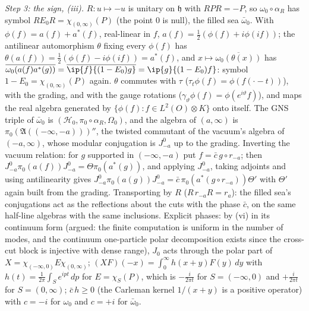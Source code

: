 \emph{Step 3: the sign, (iii).} $R : u \mapsto -u$ is unitary on $\mathfrak{h}$ with $RPR = -P$, so $\omega_{0}\circ\alpha_{R}$ has symbol $RE_{0}R = \chi_{(0,\infty)}(P)$ (the point $0$ is null), the filled sea $\bar\omega_{0}$. With $\phi(f) = a(f) + a^{*}(f)$, real-linear in $f$, $a(f) = \tfrac12(\phi(f) + i\phi(if))$; the antilinear automorphism $\theta$ fixing every $\phi(f)$ has $\theta(a(f)) = \tfrac12(\phi(f) - i\phi(if)) = a^{*}(f)$, and $x \mapsto \overline{\omega_{0}(\theta(x))}$ has $\overline{\omega_{0}(a(f)a^{*}(g))} = \overline{\ip{f}{(1 - E_{0})g}} = \ip{g}{(1 - E_{0})f}$: symbol $1 - E_{0} = \chi_{(0,\infty)}(P)$ again. $\theta$ commutes with $\tau$ ($\tau_{t}\phi(f) = \phi(f(\cdot - t))$), with the grading, and with the gauge rotations ($\gamma_{\vartheta}\phi(f) = \phi(e^{i\vartheta}f)$), and maps the real algebra generated by $\{\phi(f) : f \in L^{2}(O)\otimes K\}$ onto itself. The GNS triple of $\bar\omega_{0}$ is $(\mathcal{H}_{0}, \pi_{0}\circ\alpha_{R}, \Omega_{0})$, and the algebra of $(a, \infty)$ is $\pi_{0}(\mathfrak{A}((-\infty, -a)))''$, the twisted commutant of the vacuum's algebra of $(-a, \infty)$, whose modular conjugation is $J^{0}_{-a}$ up to the grading. Inverting the vacuum relation: for $g$ supported in $(-\infty, -a)$ put $f = \bar c\,g\circ r_{-a}$; then $J^{0}_{-a}\pi_{0}(a(f))J^{0}_{-a} = \Theta\pi_{0}(a^{*}(g))$, and applying $J^{0}_{-a}$, taking adjoints and using antilinearity gives $J^{0}_{-a}\pi_{0}(a(g))J^{0}_{-a} = \bar c\,\pi_{0}(a^{*}(g\circ r_{-a}))\Theta'$ with $\Theta'$ again built from the grading. Transporting by $R$ ($R\,r_{-a}R = r_{a}$): the filled sea's conjugations act as the reflections about the cuts with the phase $\bar c$, on the same half-line algebras with the same inclusions. Explicit phases: by (vi) in its continuum form (argued: the finite computation is uniform in the number of modes, and the continuum one-particle polar decomposition exists since the cross-cut block is injective with dense range), $J_{0}$ acts through the polar part of $X = \chi_{(-\infty,0)}E\chi_{(0,\infty)}$; $(XF)(-x) = \int_{0}^{\infty}h(x + y)F(y)\,dy$ with $h(t) = \frac{1}{2\pi}\int_{S}e^{ipt}\,dp$ for $E = \chi_{S}(P)$, which is $-\frac{i}{2\pi t}$ for $S = (-\infty, 0)$ and $+\frac{i}{2\pi t}$ for $S = (0, \infty)$; $\bar c\,h \geq 0$ (the Carleman kernel $1/(x + y)$ is a positive operator) with $c = -i$ for $\omega_{0}$ and $c = +i$ for $\bar\omega_{0}$.

